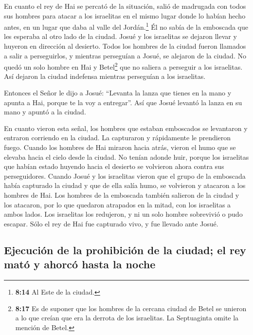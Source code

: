  En cuanto el rey de Hai se percató de la situación,
salió de madrugada con todos sus hombres para atacar a los israelitas en
el mismo lugar donde lo habían hecho antes, en un lugar que daba al
valle del Jordán.\footnote{\textbf{8:14} Al Este de la ciudad.} Él no
sabía de la emboscada que les esperaba al otro lado de la ciudad.
 Josué y los israelitas se dejaron llevar y huyeron en
dirección al desierto.  Todos los hombres de la ciudad
fueron llamados a salir a perseguirlos, y mientras perseguían a Josué,
se alejaron de la ciudad.  No quedó un solo hombre en Hai
y Betel\footnote{\textbf{8:17} Es de suponer que los hombres de la
  cercana ciudad de Betel se unieron a lo que creían que era la derrota
  de los israelitas. La Septuaginta omite la mención de Betel.} que no
saliera a perseguir a los israelitas. Así dejaron la ciudad indefensa
mientras perseguían a los israelitas.

 Entonces el Señor le dijo a Josué: ``Levanta la lanza
que tienes en la mano y apunta a Hai, porque te la voy a entregar''. Así
que Josué levantó la lanza en su mano y apuntó a la ciudad.

 En cuanto vieron esta señal, los hombres que estaban
emboscados se levantaron y entraron corriendo en la ciudad. La
capturaron y rápidamente le prendieron fuego.  Cuando los
hombres de Hai miraron hacia atrás, vieron el humo que se elevaba hacia
el cielo desde la ciudad. No tenían adonde huir, porque los israelitas
que habían estado huyendo hacia el desierto se volvieron ahora contra
sus perseguidores.  Cuando Josué y los israelitas vieron
que el grupo de la emboscada había capturado la ciudad y que de ella
salía humo, se volvieron y atacaron a los hombres de Hai.
 Los hombres de la emboscada también salieron de la
ciudad y los atacaron, por lo que quedaron atrapados en la mitad, con
los israelitas a ambos lados. Los israelitas los redujeron, y ni un solo
hombre sobrevivió o pudo escapar.  Sólo el rey de Hai fue
capturado vivo, y fue llevado ante Josué.

\hypertarget{ejecuciuxf3n-de-la-prohibiciuxf3n-de-la-ciudad-el-rey-matuxf3-y-ahorcuxf3-hasta-la-noche}{%
\subsection{Ejecución de la prohibición de la ciudad; el rey mató y
ahorcó hasta la
noche}\label{ejecuciuxf3n-de-la-prohibiciuxf3n-de-la-ciudad-el-rey-matuxf3-y-ahorcuxf3-hasta-la-noche}}

